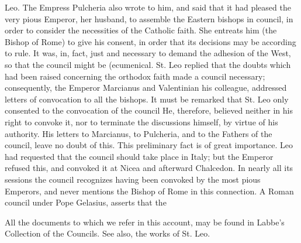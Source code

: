 Leo. The Empress Pulcheria also wrote to him, and said that it had pleased the very pious Emperor, her husband, to assemble the Eastern bishops in council, in order to consider the necessities of the Catholic faith. She entreats him (the Bishop of Rome) to give his consent, in order that its decisions may be according to rule. It was, in, fact, just and necessary to demand the adhesion of the West, so that the council might be (ecumenical. St. Leo replied that the doubts which had been raised concerning the orthodox faith made a council necessary; consequently, the Emperor Marcianus and Valentinian his colleague, addressed letters of convocation to all the bishops. It must be remarked that St. Leo only consented to the convocation of the council He, therefore, believed neither in his right to convoke it, nor to terminate the discussions himself, by virtue of his authority. His letters to Marcianus, to Pulcheria, and to the Fathers of the council, leave no doubt of this. This preliminary fact is of great importance. Leo had requested that the council should take place in Italy; but the Emperor refused this, and convoked it at Nicea and afterward Chalcedon. In nearly all its sessions the council recognizes having been convoked by the most pious Emperors, and never mentions the Bishop of Rome in this connection. A Roman council under Pope Gelasius, asserts that the

All the documents to which we refer in this account, may be found in Labbe’s Collection of the Councils. See also, the works of St. Leo.

